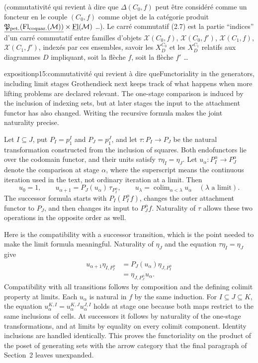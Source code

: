 (commutativité qui revient à dire que $\Delta(C_0,f)$ peut être considéré comme un foncteur en le couple $(C_0,f)$ comme objet de la catégorie produit $\underline{\mathfrak{P}_{\text{pet.}}(\mathrm{Fl}_{\text{coquar.}}(\mathcal{M}))}\times\underline{\mathrm{Fl}}(\mathcal{M})$ \ldots). Le carré commutatif (2.7) est la partie ``indices'' d'un carré commutatif entre familles d'objets $\mathscr{X}(C_0,f)$, $\mathscr{X}(C_0,f')$, $\mathscr{X}(C_1,f)$, $\mathscr{X}(C_1,f')$,
indexés par ces ensembles, savoir les $X_D^{C_0}$ et les $X_D^{C_1}$ relatifs aux diagrammes $D$ impliquant, soit la flèche $f$, soit la flèche $f'$ \ldots

\begin{dcomment}{exposition}{p15:commutativité qui revient à dire que}{Functoriality in the generators, including limit stages}
Grothendieck next keeps track of what happens when more lifting problems are declared relevant. The one-stage comparison is induced by the inclusion of indexing sets, but at later stages the input to the attachment functor has also changed. Writing the recursive formula makes the joint naturality precise.

Let $I\subseteq J$, put $P_I=p_1^I$ and $P_J=p_1^J$, and let $\tau:P_I\to P_J$ be the natural transformation constructed from the inclusion of squares. Both endofunctors lie over the codomain functor, and their units satisfy $\tau\eta_I=\eta_J$. Let $u_\alpha:P_I^\alpha\to P_J^\alpha$ denote the comparison at stage $\alpha$, where the superscript means the continuous iteration used in the text, not ordinary iteration at a limit. Then
\[
 u_0=1,\qquad
 u_{\alpha+1}=P_J(u_\alpha)\,\tau_{P_I^\alpha},\qquad
 u_\lambda=\mathop{\mathrm{colim}}_{\alpha<\lambda}u_\alpha
 \quad(\lambda\text{ a limit}).
\]
The successor formula starts with $P_I(P_I^\alpha f)$, changes the outer attachment functor to $P_J$, and then changes its input to $P_J^\alpha f$. Naturality of $\tau$ allows these two operations in the opposite order as well.

Here is the compatibility with a successor transition, which is the point needed to make the limit formula meaningful. Naturality of $\eta_J$ and the equation $\tau\eta_I=\eta_J$ give
\[
 \begin{split}
 u_{\alpha+1}\eta_{I,P_I^\alpha}
 &=P_J(u_\alpha)\eta_{J,P_I^\alpha}\\
 &=\eta_{J,P_J^\alpha}u_\alpha.
 \end{split}
\]
Compatibility with all transitions follows by composition and the defining colimit property at limits. Each $u_\alpha$ is natural in $f$ by the same induction. For $I\subseteq J\subseteq K$, the equation $u_\alpha^{K,I}=u_\alpha^{K,J}u_\alpha^{J,I}$ holds at stage one because both maps restrict to the same inclusions of cells. At successors it follows by naturality of the one-stage transformations, and at limits by equality on every colimit component. Identity inclusions are handled identically. This proves the functoriality on the product of the poset of generating sets with the arrow category that the final paragraph of Section~2 leaves unexpanded.


\end{dcomment}
